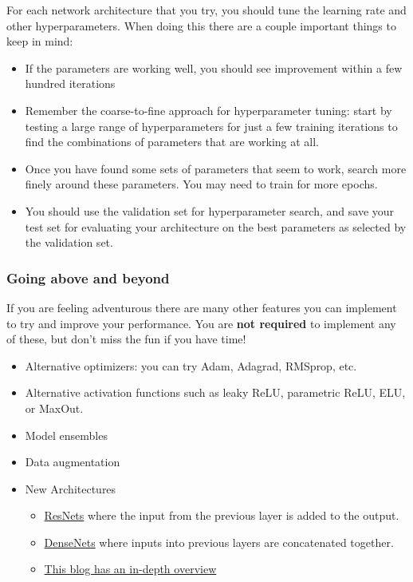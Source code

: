 \documentclass[11pt]{article}
\providecommand{\tightlist}{%
      \setlength{\itemsep}{0pt}\setlength{\parskip}{0pt}}
\begin{document}
For each network architecture that you try, you should tune the learning
rate and other hyperparameters. When doing this there are a couple
important things to keep in mind:

\begin{itemize}
\tightlist
\item
  If the parameters are working well, you should see improvement within
  a few hundred iterations
\item
  Remember the coarse-to-fine approach for hyperparameter tuning: start
  by testing a large range of hyperparameters for just a few training
  iterations to find the combinations of parameters that are working at
  all.
\item
  Once you have found some sets of parameters that seem to work, search
  more finely around these parameters. You may need to train for more
  epochs.
\item
  You should use the validation set for hyperparameter search, and save
  your test set for evaluating your architecture on the best parameters
  as selected by the validation set.
\end{itemize}

\hypertarget{going-above-and-beyond}{%
\subsubsection{Going above and beyond}\label{going-above-and-beyond}}

If you are feeling adventurous there are many other features you can
implement to try and improve your performance. You are \textbf{not
required} to implement any of these, but don't miss the fun if you have
time!

\begin{itemize}
\tightlist
\item
  Alternative optimizers: you can try Adam, Adagrad, RMSprop, etc.
\item
  Alternative activation functions such as leaky ReLU, parametric ReLU,
  ELU, or MaxOut.
\item
  Model ensembles
\item
  Data augmentation
\item
  New Architectures

  \begin{itemize}
  \tightlist
  \item
    \href{https://arxiv.org/abs/1512.03385}{ResNets} where the input
    from the previous layer is added to the output.
  \item
    \href{https://arxiv.org/abs/1608.06993}{DenseNets} where inputs into
    previous layers are concatenated together.
  \item
    \href{https://chatbotslife.com/resnets-highwaynets-and-densenets-oh-my-9bb15918ee32}{This
    blog has an in-depth overview}
  \end{itemize}
\end{itemize}
\end{document}

